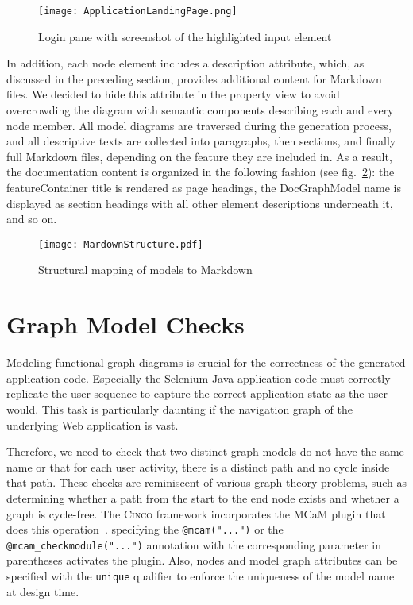 \begin{figure}[h]
    \centering
    \texttt{[image: ApplicationLandingPage.png]}
    \caption{Login pane with screenshot of the highlighted input element}
    \label{fig:screenshot}
\end{figure}

In addition, each node element includes a description attribute, which, as discussed in the preceding section, provides additional content for Markdown files. We decided to hide this attribute in the property view to avoid overcrowding the diagram with semantic components describing each and every node member. All model diagrams are traversed during the generation process, and all descriptive texts are collected into paragraphs, then sections, and finally full Markdown files, depending on the feature they are included in. As a result, the documentation content is organized in the following fashion (see fig.~\ref{fig:markdown}): the featureContainer title is rendered as page headings, the DocGraphModel name is displayed as section headings with all other element descriptions underneath it, and so on.

\begin{figure}[h]
    \centering
    \texttt{[image: MardownStructure.pdf]}
    \caption{Structural mapping of models to Markdown}
    \label{fig:markdown}
\end{figure}

\section{Graph Model Checks}\label{sec:modCheck}

Modeling functional graph diagrams is crucial for the correctness of the generated application code. Especially the Selenium-Java application code must correctly replicate the user sequence to capture the correct application state as the user would. This task is particularly daunting if the navigation graph of the underlying Web application is vast.

Therefore, we need to check that two distinct graph models do not have the same name or that for each user activity, there is a distinct path and no cycle inside that path.  These checks are reminiscent of various graph theory problems, such as determining whether a path from the start to the end node exists and whether a graph is cycle-free. The \textsc{Cinco} framework incorporates the MCaM plugin that does this operation~\cite{gitlabcinco}. specifying the \lstinline{@mcam("...")} or the \lstinline{@mcam_checkmodule("...")} annotation with the corresponding parameter in parentheses activates the plugin. Also, nodes and model graph attributes can be specified with the \lstinline[language=MGL]{unique} qualifier to enforce the uniqueness of the model name at design time.

